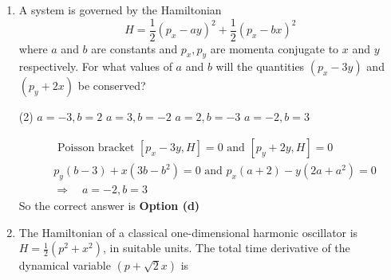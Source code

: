 \begin{enumerate}
 \begin{tasks}(4)
	\task[\textbf{a.}]$|\vec{r}||\vec{p}|$
	\task[\textbf{b.}] $\hat{r} \cdot \hat{p}$
\end{tasks}
\begin{answer}
	$$
	\begin{aligned}
	\vec{r}&=x \hat{i}+y \hat{j}+z \hat{k},|\vec{r}|=\left(x^{2}+y^{2}+z^{2}\right)^{1 / 2}, p=p_{x} \hat{i}+p_{y} \hat{j}+p_{z} \hat{k}\\
	|\vec{p}|&=\left(p_{x}^{2}+p_{y}^{2}+p_{z}^{2}\right)^{1 / 2}\\
	\{|\vec{r}|,|\vec{p}|\}&=\left(\frac{\partial|\vec{r}|}{\partial x} \cdot \frac{\partial|\vec{p}|}{\partial p_{x}}-\frac{\partial|\vec{r}|}{\partial p_{x}} \cdot \frac{\partial|\vec{p}|}{\partial x}\right)+\left(\frac{\partial|\vec{r}|}{\partial y} \cdot \frac{\partial|\vec{p}|}{\partial p_{y}}-\frac{\partial|\vec{r}|}{\partial p_{y}} \cdot \frac{\partial|\vec{p}|}{\partial y}\right)+\left(\frac{\partial|\vec{r}|}{\partial z} \cdot \frac{\partial|\vec{p}|}{\partial p_{z}}-\frac{\partial|\vec{r}|}{\partial p_{z}} \cdot \frac{\partial|\vec{p}|}{\partial y}\right)\\
	&=\frac{x}{|\vec{r}|} \frac{p_{x}}{|\vec{p}|}+\frac{y}{|\vec{r}|} \frac{p_{y}}{|\vec{p}|}+\frac{z}{|\vec{r}|} \frac{p_{z}}{|\vec{p}|}=\frac{\vec{r} \cdot \vec{p}}{|\vec{r}||\vec{p}|}=(\hat{r} \cdot \hat{p})
\end{aligned}
$$
So the correct answer is \textbf{Option (b)}
\end{answer}
\item A system is governed by the Hamiltonian
$$
H=\frac{1}{2}\left(p_{x}-a y\right)^{2}+\frac{1}{2}\left(p_{x}-b x\right)^{2}
$$
where $a$ and $b$ are constants and $p_{x}, p_{y}$ are momenta conjugate to $x$ and $y$ respectively.
For what values of $a$ and $b$ will the quantities $\left(p_{x}-3 y\right)$ and $\left(p_{y}+2 x\right)$ be conserved?

 \begin{tasks}(2)
	\task[\textbf{a.}]$a=-3, b=2$
	\task[\textbf{b.}]$a=3, b=-2$
	\task[\textbf{c.}]$a=2, b=-3$
	\task[\textbf{d.}] $a=-2, b=3$
\end{tasks}
\begin{answer}
	$$
	\begin{aligned}
	&\text { Poisson bracket }\left[p_{x}-3 y, H\right]=0 \text { and }\left[p_{y}+2 y, H\right]=0\\
	&p_{y}(b-3)+x\left(3 b-b^{2}\right)=0 \text { and } p_{x}(a+2)-y\left(2 a+a^{2}\right)=0\\
	&\Rightarrow \quad a=-2, b=3
\end{aligned}
$$
So the correct answer is \textbf{Option (d)}
\end{answer}
\item The Hamiltonian of a classical one-dimensional harmonic oscillator is $H=\frac{1}{2}\left(p^{2}+x^{2}\right)$, in suitable units. The total time derivative of the dynamical variable $(p+\sqrt{2} x)$ is


\end{enumerate}
